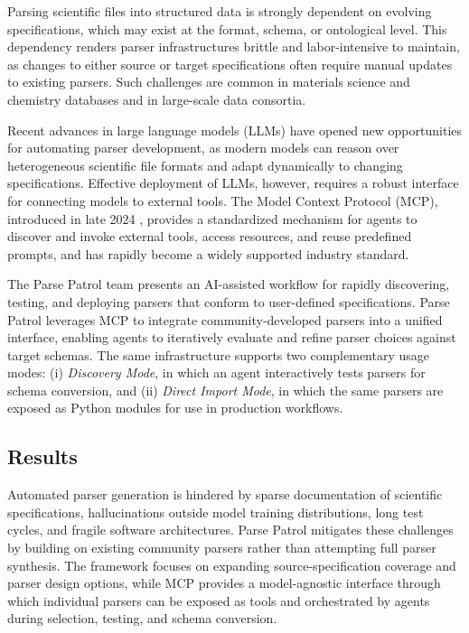 Parsing scientific files into structured data is strongly dependent on evolving specifications, which may exist at the format, schema, or ontological level. This dependency renders parser infrastructures brittle and labor-intensive to maintain, as changes to either source or target specifications often require manual updates to existing parsers. Such challenges are common in materials science and chemistry databases and in large-scale data consortia.

Recent advances in large language models (LLMs) have opened new opportunities for automating parser development, as modern models can reason over heterogeneous scientific file formats and adapt dynamically to changing specifications. Effective deployment of LLMs, however, requires a robust interface for connecting models to external tools. The Model Context Protocol (MCP), introduced in late 2024 \cite{mcp2024, mcp_def}, provides a standardized mechanism for agents to discover and invoke external tools, access resources, and reuse predefined prompts, and has rapidly become a widely supported industry standard.

The Parse Patrol team presents an AI-assisted workflow for rapidly discovering, testing, and deploying parsers that conform to user-defined specifications. Parse Patrol leverages MCP to integrate community-developed parsers into a unified interface, enabling agents to iteratively evaluate and refine parser choices against target schemas. The same infrastructure supports two complementary usage modes: (i) \textit{Discovery Mode}, in which an agent interactively tests parsers for schema conversion, and (ii) \textit{Direct Import Mode}, in which the same parsers are exposed as Python modules for use in production workflows.


\subsection*{Results}

Automated parser generation is hindered by sparse documentation of scientific specifications, hallucinations outside model training distributions, long test cycles, and fragile software architectures. Parse Patrol mitigates these challenges by building on existing community parsers rather than attempting full parser synthesis. The framework focuses on expanding source-specification coverage and parser design options, while MCP provides a model-agnostic interface through which individual parsers can be exposed as tools and orchestrated by agents during selection, testing, and schema conversion.

